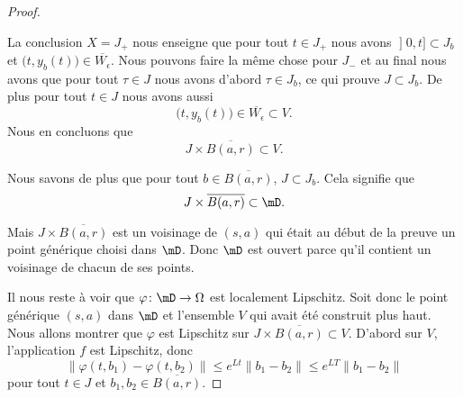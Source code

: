 \begin{proof}
\begin{subproof}
	\end{subproof}

	La conclusion \( X=J_+\) nous enseigne que pour tout \( t\in J_+\) nous avons \( \mathopen] 0 , t \mathclose]\subset J_b\) et \( \big( t,y_b(t) \big)\in \overline{ W_{\epsilon} }\). Nous pouvons faire la même chose pour \( J_-\) et au final nous avons que pour tout \( \tau\in J\) nous avons d'abord \( \tau\in J_b\), ce qui prouve \( J\subset J_b\). De plus pour tout \( t\in J\) nous avons aussi
	\begin{equation}
		\big( t,y_b(t) \big)\in\overline{ W_{\epsilon} }\subset V.
	\end{equation}
	Nous en concluons que
	\begin{equation}
		J\times \overline{ B(a,r) }\subset V.
	\end{equation}

	Nous savons de plus que pour tout \( b\in \overline{ B(a,r) }\), \( J\subset J_b\). Cela signifie que
	\begin{equation}
		J\times \overline{ B(a,r) }\subset \mD.
	\end{equation}

	Mais \( J\times \overline{ B(a,r) }\) est un voisinage de \( (s,a)\) qui était au début de la preuve un point générique choisi dans \( \mD\). Donc \( \mD\) est ouvert parce qu'il contient un voisinage de chacun de ses points.

	Il nous reste à voir que \( \varphi\colon \mD\to \Omega\) est localement Lipschitz. Soit donc le point générique \( (s,a)\) dans \( \mD\) et l'ensemble \( V\) qui avait été construit plus haut. Nous allons montrer que \( \varphi\) est Lipschitz sur \( J\times \overline{ B(a,r) }\subset V\). D'abord sur \( V\), l'application \( f\) est Lipschitz, donc
	\begin{equation}
		\| \varphi(t,b_1)-\varphi(t,b_2) \|\leq  e^{Lt}\| b_1-b_2 \|
		\leq  e^{LT}\| b_1-b_2 \|
	\end{equation}
	pour tout \( t\in J\) et \( b_1,b_2\in \overline{ B(a,r) }\).


\end{proof}
